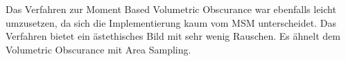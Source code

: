 \documentclass[runningheaders,a4paper]{llncs}
\begin{document}
Das Verfahren zur Moment Based Volumetric Obscurance war ebenfalls leicht umzusetzen, da sich die Implementierung kaum vom MSM unterscheidet. Das Verfahren bietet ein ästethisches Bild mit sehr wenig Rauschen. Es ähnelt dem Volumetric Obscurance mit Area Sampling.



\end{document}
